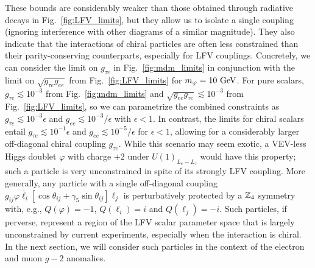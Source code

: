 {These bounds are considerably weaker than those obtained through radiative decays in Fig.~\ref{fig:LFV_limits}, but they allow us to isolate a single coupling (ignoring interference with other diagrams of a similar magnitude). They also indicate that the interactions of chiral particles are often less constrained than their parity-conserving counterparts, especially for LFV couplings. Concretely, we can consider the limit on $g_{\tau e}$ in Fig.~\ref{fig:mdm_limits} in conjunction with the limit on $\sqrt{g_{\tau e}g_{ee}}$ from Fig.~\ref{fig:LFV_limits} for $m_\varphi = 10~{\rm GeV}$. For pure scalars, $g_{\tau e} \lesssim 10^{-3}$ from Fig.~\ref{fig:mdm_limits} and $\sqrt{g_{ee}g_{\tau e}} \lesssim 10^{-3}$ from Fig.~\ref{fig:LFV_limits}, so we can parametrize the combined constraints as $g_{\tau e} \lesssim 10^{-3}\epsilon$ and $g_{ee} \lesssim 10^{-3}/\epsilon$ with $\epsilon < 1$. In contrast, the limits for chiral scalars entail $g_{\tau e}\lesssim 10^{-1}\epsilon$ and $g_{ee}\lesssim 10^{-5}/\epsilon$ for $\epsilon < 1$, allowing for a considerably larger off-diagonal chiral coupling $g_{\tau e}$. While this scenario may seem exotic, a VEV-less Higgs doublet $\varphi$ with charge $+2$ under $U(1)_{L_e - L_\tau}$ would have this property; such a particle is very unconstrained in spite of its strongly LFV coupling. More generally, any particle with a single off-diagonal coupling $g_{ij}\varphi \bar{\ell}_i[\cos{\theta_{ij}}+\gamma_5 \sin{\theta_{ij}}]\ell_j$ is perturbatively protected by a ${\Bbb Z}_4$ symmetry with, e.g., $Q(\varphi) = -1$, $Q(\ell_i) = i$ and $Q(\ell_j) = -i$. Such particles, if perverse, represent a region of the LFV scalar parameter space that is largely unconstrained by current experiments, especially when the interaction is chiral. In the next section, we will consider such particles in the context of the electron and muon $g-2$ anomalies.

}
